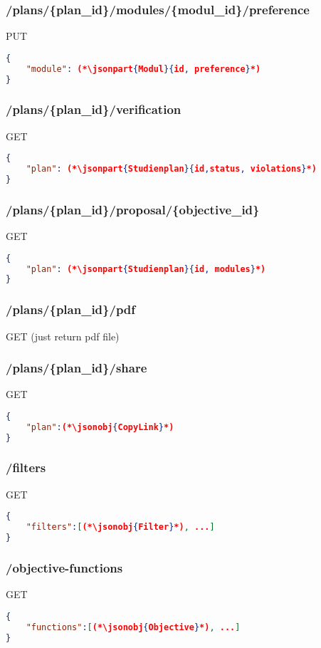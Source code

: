 \subsubsection{/plans/\{plan\_id\}/modules/\{modul\_id\}/preference}
PUT
\begin{lstlisting}[language=json,firstnumber=1]
{
	"module": (*\jsonpart{Modul}{id, preference}*)
}
\end{lstlisting}

\subsubsection{/plans/\{plan\_id\}/verification}
GET
\begin{lstlisting}[language=json,firstnumber=1]
{
	"plan": (*\jsonpart{Studienplan}{id,status, violations}*)
}
\end{lstlisting}

\subsubsection{/plans/\{plan\_id\}/proposal/\{objective\_id\}}
GET
\begin{lstlisting}[language=json,firstnumber=1]
{
	"plan": (*\jsonpart{Studienplan}{id, modules}*)
}
\end{lstlisting}

\subsubsection{/plans/\{plan\_id\}/pdf}
GET (just return pdf file)

\subsubsection{/plans/\{plan\_id\}/share}
GET
\begin{lstlisting}[language=json,firstnumber=1]
{
	"plan":(*\jsonobj{CopyLink}*)
}
\end{lstlisting}

\subsubsection{/filters}
GET
\begin{lstlisting}[language=json,firstnumber=1]
{
	"filters":[(*\jsonobj{Filter}*), ...]
}
\end{lstlisting}

\subsubsection{/objective-functions}
GET
\begin{lstlisting}[language=json,firstnumber=1]
{
	"functions":[(*\jsonobj{Objective}*), ...]
}
\end{lstlisting}